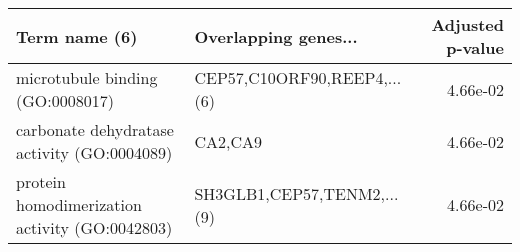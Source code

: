 \begin{tabular}{llr}
\toprule
                                 Term name (6) &        Overlapping genes... &  Adjusted p-value \\
\midrule
              microtubule binding (GO:0008017) & CEP57,C10ORF90,REEP4,...(6) &          4.66e-02 \\
   carbonate dehydratase activity (GO:0004089) &                     CA2,CA9 &          4.66e-02 \\
protein homodimerization activity (GO:0042803) &  SH3GLB1,CEP57,TENM2,...(9) &          4.66e-02 \\
\bottomrule
\end{tabular}
